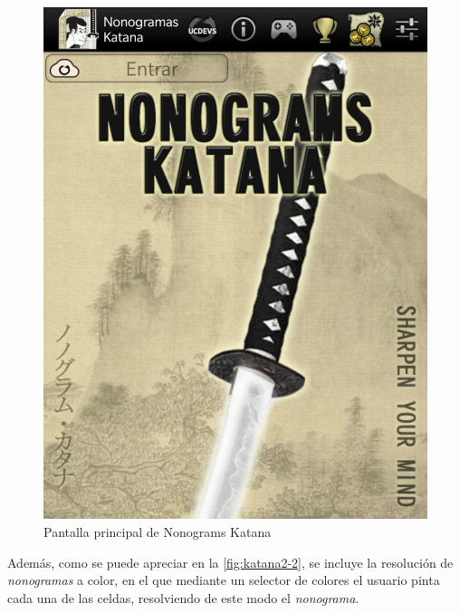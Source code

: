 \begin{figure}[H]
   \centering
   \includegraphics[scale=.15]{images/nonokatana1.jpg}
   \caption{Pantalla principal de Nonograms Katana}
   \label{fig:katana1}
 \end{figure}

 Además, como se puede apreciar en la \autoref{fig:katana2-2}, se incluye la resolución de \textit{nonogramas} a color, en el que mediante un selector
 de colores el usuario pinta cada una de las celdas, resolviendo de este modo el \textit{nonograma}.

